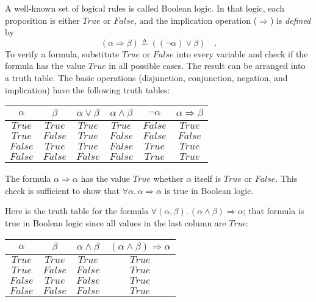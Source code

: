 A well-known set of logical rules is called Boolean
logic. In that logic, each proposition is either $True$ or $False$,
and the implication operation ($\Rightarrow$) is \emph{defined} by
\begin{equation}
\left(\alpha\Rightarrow\beta\right)\triangleq\left((\neg\alpha)\vee\beta\right)\quad.\label{eq:ch-definition-of-implication-in-Boolean-logic}
\end{equation}
To verify a formula, substitute $True$ or $False$ into every variable
and check if the formula has the value $True$ in all possible cases.
The result can be arranged into a truth table.
The basic operations (disjunction, conjunction, negation, and implication)
have the following truth tables:
\begin{center}
{\small{}}%
\begin{tabular}{|c|c|c|c|c|c|}
\hline 
{\small{}$\alpha$} & {\small{}$\beta$} & \textbf{\small{}$\alpha\vee\beta$} & \textbf{\small{}$\alpha\wedge\beta$} & \textbf{\small{}$\neg\alpha$} & \textbf{\small{}$\alpha\Rightarrow\beta$}\tabularnewline
\hline 
\hline 
{\small{}$True$} & {\small{}$True$} & {\small{}$True$} & {\small{}$True$} & {\small{}$False$} & {\small{}$True$}\tabularnewline
\hline 
{\small{}$True$} & {\small{}$False$} & {\small{}$True$} & {\small{}$False$} & {\small{}$False$} & {\small{}$False$}\tabularnewline
\hline 
{\small{}$False$} & {\small{}$True$} & {\small{}$True$} & {\small{}$False$} & {\small{}$True$} & {\small{}$True$}\tabularnewline
\hline 
{\small{}$False$} & {\small{}$False$} & {\small{}$False$} & {\small{}$False$} & {\small{}$True$} & {\small{}$True$}\tabularnewline
\hline 
\end{tabular}{\small\par}
\par\end{center}

The formula $\alpha\Rightarrow\alpha$ has the value $True$ whether
$\alpha$ itself is $True$ or $False$. This check is sufficient
to show that $\forall\alpha.\,\alpha\Rightarrow\alpha$ is true in
Boolean logic.

Here is the truth table for the formula $\forall(\alpha,\beta).\,(\alpha\wedge\beta)\Rightarrow\alpha$;
that formula is true in Boolean logic since all values in the last
column are $True$:
\begin{center}
{\small{}}%
\begin{tabular}{|c|c|c|c|}
\hline 
{\small{}$\alpha$} & {\small{}$\beta$} & \textbf{\small{}$\alpha\wedge\beta$} & {\small{}$(\alpha\wedge\beta)\Rightarrow\alpha$}\tabularnewline
\hline 
\hline 
{\small{}$True$} & {\small{}$True$} & {\small{}$True$} & {\small{}$True$}\tabularnewline
\hline 
{\small{}$True$} & {\small{}$False$} & {\small{}$False$} & {\small{}$True$}\tabularnewline
\hline 
{\small{}$False$} & {\small{}$True$} & {\small{}$False$} & {\small{}$True$}\tabularnewline
\hline 
{\small{}$False$} & {\small{}$False$} & {\small{}$False$} & {\small{}$True$}\tabularnewline
\hline 
\end{tabular}{\small\par}
\par\end{center}

